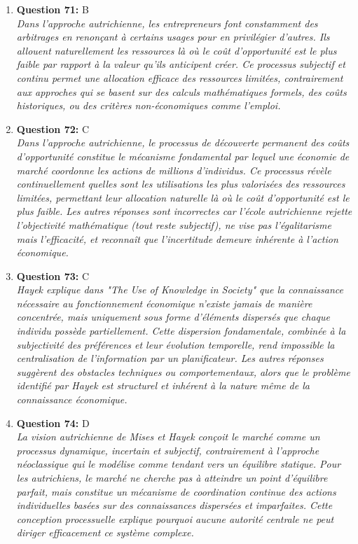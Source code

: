\documentclass[12pt,a4paper]{article}
\begin{document}
\begin{enumerate}
\item \textbf{Question 71:} B
\\ \textit{Dans l'approche autrichienne, les entrepreneurs font constamment des arbitrages en renonçant à certains usages pour en privilégier d'autres. Ils allouent naturellement les ressources là où le coût d'opportunité est le plus faible par rapport à la valeur qu'ils anticipent créer. Ce processus subjectif et continu permet une allocation efficace des ressources limitées, contrairement aux approches qui se basent sur des calculs mathématiques formels, des coûts historiques, ou des critères non-économiques comme l'emploi.}

\item \textbf{Question 72:} C
\\ \textit{Dans l'approche autrichienne, le processus de découverte permanent des coûts d'opportunité constitue le mécanisme fondamental par lequel une économie de marché coordonne les actions de millions d'individus. Ce processus révèle continuellement quelles sont les utilisations les plus valorisées des ressources limitées, permettant leur allocation naturelle là où le coût d'opportunité est le plus faible. Les autres réponses sont incorrectes car l'école autrichienne rejette l'objectivité mathématique (tout reste subjectif), ne vise pas l'égalitarisme mais l'efficacité, et reconnaît que l'incertitude demeure inhérente à l'action économique.}

\item \textbf{Question 73:} C
\\ \textit{Hayek explique dans "The Use of Knowledge in Society" que la connaissance nécessaire au fonctionnement économique n'existe jamais de manière concentrée, mais uniquement sous forme d'éléments dispersés que chaque individu possède partiellement. Cette dispersion fondamentale, combinée à la subjectivité des préférences et leur évolution temporelle, rend impossible la centralisation de l'information par un planificateur. Les autres réponses suggèrent des obstacles techniques ou comportementaux, alors que le problème identifié par Hayek est structurel et inhérent à la nature même de la connaissance économique.}

\item \textbf{Question 74:} D
\\ \textit{La vision autrichienne de Mises et Hayek conçoit le marché comme un processus dynamique, incertain et subjectif, contrairement à l'approche néoclassique qui le modélise comme tendant vers un équilibre statique. Pour les autrichiens, le marché ne cherche pas à atteindre un point d'équilibre parfait, mais constitue un mécanisme de coordination continue des actions individuelles basées sur des connaissances dispersées et imparfaites. Cette conception processuelle explique pourquoi aucune autorité centrale ne peut diriger efficacement ce système complexe.}


\end{enumerate}
\end{document}
